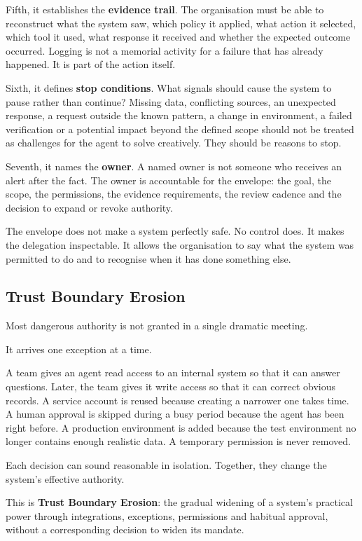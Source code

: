 Fifth, it establishes the \textbf{evidence trail}. The organisation must
be able to reconstruct what the system saw, which policy it applied,
what action it selected, which tool it used, what response it received
and whether the expected outcome occurred. Logging is not a memorial
activity for a failure that has already happened. It is part of the
action itself.

Sixth, it defines \textbf{stop conditions}. What signals should cause
the system to pause rather than continue? Missing data, conflicting
sources, an unexpected response, a request outside the known pattern, a
change in environment, a failed verification or a potential impact
beyond the defined scope should not be treated as challenges for the
agent to solve creatively. They should be reasons to stop.

Seventh, it names the \textbf{owner}. A named owner is not someone who
receives an alert after the fact. The owner is accountable for the
envelope: the goal, the scope, the permissions, the evidence
requirements, the review cadence and the decision to expand or revoke
authority.

The envelope does not make a system perfectly safe. No control does. It
makes the delegation inspectable. It allows the organisation to say what
the system was permitted to do and to recognise when it has done
something else.

\subsection{Trust Boundary Erosion}\label{trust-boundary-erosion}

Most dangerous authority is not granted in a single dramatic meeting.

It arrives one exception at a time.

A team gives an agent read access to an internal system so that it can
answer questions. Later, the team gives it write access so that it can
correct obvious records. A service account is reused because creating a
narrower one takes time. A human approval is skipped during a busy
period because the agent has been right before. A production environment
is added because the test environment no longer contains enough
realistic data. A temporary permission is never removed.

Each decision can sound reasonable in isolation. Together, they change
the system's effective authority.

This is \textbf{Trust Boundary Erosion}: the gradual widening of a
system's practical power through integrations, exceptions, permissions
and habitual approval, without a corresponding decision to widen its
mandate.

